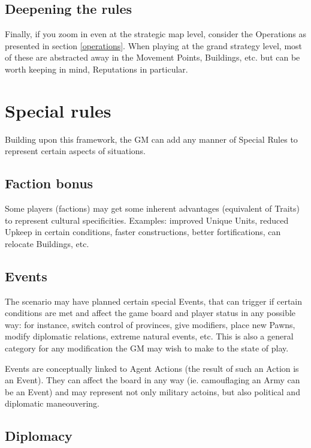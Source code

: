 \subsection{Deepening the rules}

Finally, if you zoom in even at the strategic map level, consider the Operations as presented in section \ref{operations}. When playing at the grand strategy level, most of these are abstracted away in the Movement Points, Buildings, etc. but can be worth keeping in mind, Reputations in particular.


\section{Special rules}

Building upon this framework, the GM can add any manner of Special Rules to represent certain aspects of situations.


\subsection{Faction bonus}

Some players (factions) may get some inherent advantages (equivalent of Traits) to represent cultural specificities. Examples: improved Unique Units, reduced Upkeep in certain conditions, faster constructions, better fortifications, can relocate Buildings, etc.

\subsection{Events}

The scenario may have planned certain special Events, that can trigger if certain conditions are met and affect the game board and player status in any possible way: for instance, switch control of provinces, give modifiers, place new Pawns, modify diplomatic relations, extreme natural events, etc. This is also a general category for any modification the GM may wish to make to the state of play.

Events are conceptually linked to Agent Actions (the result of such an Action is an Event). They can affect the board in any way (ie. camouflaging an Army can be an Event) and may represent not only military actoins, but also political and diplomatic maneouvering.

\subsection{Diplomacy}

